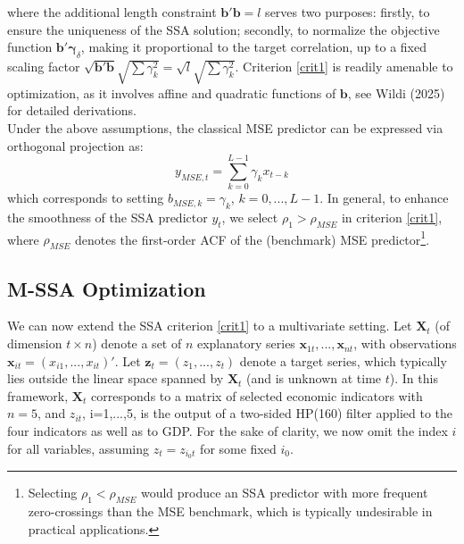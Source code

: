 \documentclass[11pt,a4paper]{article}
\begin{document}
where the additional length constraint $\mathbf{b}'\mathbf{b}=l$ serves two purposes: firstly, to ensure the uniqueness of the SSA solution; secondly, to normalize the objective function $\mathbf{b}'\boldsymbol{\gamma}_{\delta}$, making it proportional to the target correlation, up to a fixed scaling factor $\sqrt{\mathbf{b}'\mathbf{b}}\sqrt{\sum \gamma_k^2}=\sqrt{l}\sqrt{\sum \gamma_k^2}$. Criterion \ref{crit1} is readily amenable to optimization, as it involves affine and quadratic functions of $\mathbf{b}$, see Wildi (2025) for detailed derivations. \\
Under the above assumptions, the classical MSE predictor can be expressed via orthogonal projection as:
\[
y_{MSE,t}=\sum_{k=0}^{L-1}\gamma_kx_{t-k}
\]
which corresponds to setting $b_{MSE,k}=\gamma_k$, $k=0,...,L-1$. In general, to enhance the smoothness of the SSA predictor $y_t$, we select $\rho_1>\rho_{MSE}$ in criterion \ref{crit1},  where $\rho_{MSE}$ denotes the first-order ACF of the (benchmark) MSE predictor\footnote{Selecting $\rho_1<\rho_{MSE}$ would produce an SSA predictor with more frequent zero-crossings than the MSE benchmark, which is typically undesirable in practical applications.}. 
 




\subsection{M-SSA Optimization}


We can now extend the SSA criterion \ref{crit1} to a multivariate setting. Let $\mathbf{X}_t$ (of dimension $t\times n$) denote a set of $n$ explanatory series $\mathbf{x}_{1t},...,\mathbf{x}_{nt}$, with observations $\mathbf{x}_{it}=(x_{i1},...,x_{it})'$. Let $\mathbf{z}_t=(z_{1},...,z_t)$  denote a target series, which typically lies outside the linear space spanned by $\mathbf{X}_t$  (and is unknown at time $t$). In this framework, $\mathbf{X}_t$ corresponds to a matrix of selected economic indicators with $n=5$, and $z_{it}$, i=1,...,5,   is the output of a two-sided HP(160) filter applied to the four indicators as well as to GDP. %
For the sake of clarity, we now omit the index $i$ for all variables, assuming $z_t=z_{i_0t}$ for some fixed $i_0$.
\end{document}
